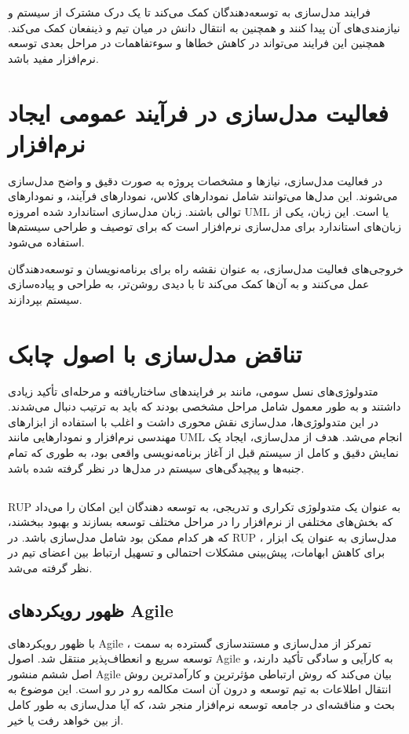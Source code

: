 فرایند مدل‌سازی به توسعه‌دهندگان کمک می‌کند تا یک درک مشترک از سیستم و نیازمندی‌های آن پیدا کنند و همچنین به انتقال دانش در میان تیم و ذینفعان کمک می‌کند. همچنین این فرایند می‌تواند در کاهش خطاها و سوءتفاهمات در مراحل بعدی توسعه نرم‌افزار مفید باشد.


\section*{فعالیت مدل‌سازی در فرآیند عمومی ایجاد نرم‌افزار}

در فعالیت مدل‌سازی، نیازها و مشخصات پروژه به صورت دقیق و واضح مدل‌سازی می‌شوند. این مدل‌ها می‌توانند شامل نمودارهای کلاس، نمودارهای فرآیند، و نمودارهای توالی باشند. زبان مدل‌سازی استاندارد شده امروزه UML یا
است. این زبان، یکی از زبان‌های استاندارد برای مدل‌سازی نرم‌افزار است که برای توصیف و طراحی سیستم‌ها استفاده می‌شود.

خروجی‌های فعالیت مدل‌سازی، به عنوان نقشه راه برای برنامه‌نویسان و توسعه‌دهندگان عمل می‌کنند و به آن‌ها کمک می‌کند تا با دیدی روشن‌تر، به طراحی و پیاده‌سازی سیستم بپردازند.

\section*{تناقض مدل‌سازی با اصول چابک}

متدولوژی‌های نسل سومی، مانند
بر فرایندهای ساختاریافته و مرحله‌ای تأکید زیادی داشتند و به طور معمول شامل مراحل مشخصی بودند که باید به ترتیب دنبال می‌شدند. در این متدولوژی‌ها، مدل‌سازی نقش محوری داشت و اغلب با استفاده از ابزارهای مهندسی نرم‌افزار و نمودارهایی مانند UML انجام می‌شد. هدف از مدل‌سازی، ایجاد یک نمایش دقیق و کامل از سیستم قبل از آغاز برنامه‌نویسی واقعی بود، به طوری که تمام جنبه‌ها و پیچیدگی‌های سیستم در مدل‌ها در نظر گرفته شده باشد.

\subsection*{}
RUP
به عنوان یک متدولوژی تکراری و تدریجی، به توسعه دهندگان این امکان را می‌داد که بخش‌های مختلفی از نرم‌افزار را در مراحل مختلف توسعه بسازند و بهبود ببخشند، که هر کدام ممکن بود شامل مدل‌سازی باشد. در RUP ، مدل‌سازی به عنوان یک ابزار برای کاهش ابهامات، پیش‌بینی مشکلات احتمالی و تسهیل ارتباط بین اعضای تیم در نظر گرفته می‌شد.

\subsection*{ظهور رویکردهای Agile}
با ظهور رویکردهای Agile ، تمرکز از مدل‌سازی و مستندسازی گسترده به سمت توسعه سریع و انعطاف‌پذیر منتقل شد. اصول Agile به کارآیی و سادگی تأکید دارند، و اصل ششم منشور Agile بیان می‌کند که روش ارتباطی مؤثرترین و کارآمدترین روش انتقال اطلاعات به تیم توسعه و درون آن است مکالمه رو در رو است. این موضوع به بحث و مناقشه‌ای در جامعه توسعه نرم‌افزار منجر شد، که آیا مدل‌سازی به طور کامل از بین خواهد رفت یا خیر.


